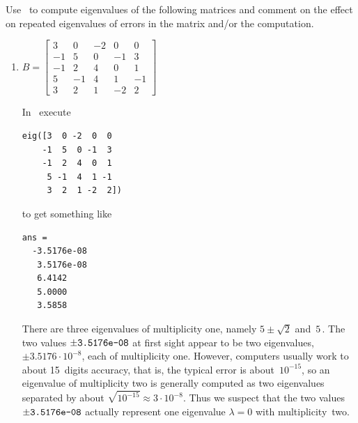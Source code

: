 \begin{example} \label{eg:}
Use \script\ to compute eigenvalues of the following matrices and comment on the effect on repeated eigenvalues of errors in the matrix and/or the computation.
\begin{enumerate}

\item \(B=\begin{bmatrix} 3&0&-2&0&0
\\-1&5&0&-1&3
\\-1&2&4&0&1
\\5&-1&4&1&-1
\\3&2&1&-2&2\end{bmatrix}\)
\begin{solution} 
In \script\ execute
\begin{verbatim}
eig([3  0 -2  0  0
    -1  5  0 -1  3
    -1  2  4  0  1
     5 -1  4  1 -1
     3  2  1 -2  2])
\end{verbatim}
\setbox\ajrqrbox\hbox{}%
\marginpar{\usebox{\ajrqrbox}}%
to get something like
\begin{verbatim}
ans =
  -3.5176e-08
   3.5176e-08
   6.4142
   5.0000
   3.5858
\end{verbatim}
There are three eigenvalues of multiplicity one, namely \(5\pm\sqrt2\) and~\(5\)\,.  
The two values \(\pm\verb|3.5176e-08|\) at first sight appear to be two eigenvalues, \(\pm3.5176\cdot10^{-8}\), each of multiplicity one.  
However, computers usually work to about 15~digits accuracy, that is, the typical error is about~\(10^{-15}\), so an eigenvalue of multiplicity two is generally computed as two eigenvalues separated by about \(\sqrt{10^{-15}}\approx3\cdot10^{-8}\).
Thus we suspect that the two values~\(\pm\verb|3.5176e-08|\) actually represent one eigenvalue \(\lambda=0\) with multiplicity~two.
\end{solution}



\end{enumerate}
\end{example}
